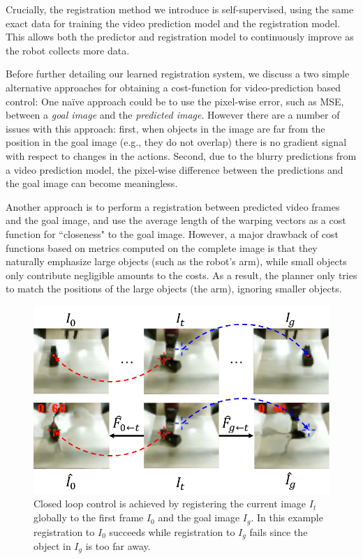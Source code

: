 Crucially, the registration method we introduce is self-supervised, using the same exact data for training the video prediction model and the registration model. This allows both the predictor and registration model to continuously improve as the robot collects more data.

Before further detailing our learned registration system, we discuss a two simple alternative approaches for obtaining a cost-function for video-prediction based control: One na\"{i}ve approach could be to use the pixel-wise error, such as MSE, between a \emph{goal image} and the \emph{predicted image}. However there are a number of issues with this approach: first, when objects in the image are far from the position in the goal image (e.g., they do not overlap) there is no gradient signal with respect to changes in the actions. Second, due to the blurry predictions from a video prediction model, the pixel-wise difference between the predictions and the goal image can become meaningless. 

Another approach is to perform a registration between predicted video frames and the goal image, and use the average length of the warping vectors as a cost function for ``closeness" to the goal image. However, a major drawback of cost functions based on metrics computed on the complete image is that they naturally emphasize large objects (such as the robot's arm), while small objects only contribute negligible amounts to the costs. As a result, the planner only tries to match the positions of the large objects (the arm), ignoring smaller objects.


\begin{figure}
	\centering
	\includegraphics[width=0.8\linewidth]{images_rfr/registration_singletime.pdf}
	\caption{\small{Closed loop control is achieved by registering the current image $I_t$ globally to the first frame $I_0$ and the goal image $I_g$. In this example registration to $I_0$ succeeds while registration to $I_g$ fails since the object in $I_g$ is too far away.}
		\label{fig:reg_single}
	}
\end{figure}

